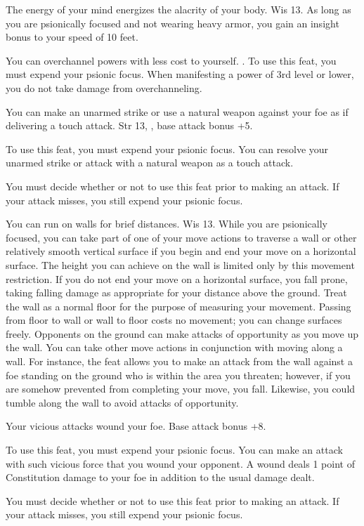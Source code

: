 {The energy of your mind energizes the alacrity of your body.}
{Wis 13.}
{As long as you are psionically focused and not wearing heavy armor, you gain an insight bonus to your speed of 10 feet.}
{}{}

{You can overchannel powers with less cost to yourself.}
{.}
{To use this feat, you must expend your psionic focus. When manifesting a power of 3rd level or lower, you do not take damage from overchanneling.}
{}{}

{You can make an unarmed strike or use a natural weapon against your foe as if delivering a touch attack.}
{Str 13, , base attack bonus +5.}
{To use this feat, you must expend your psionic focus. You can resolve your unarmed strike or attack with a natural weapon as a touch attack.

You must decide whether or not to use this feat prior to making an attack. If your attack misses, you still expend your psionic focus.}
{}{}

{You can run on walls for brief distances.}
{Wis 13.}
{While you are psionically focused, you can take part of one of your move actions to traverse a wall or other relatively smooth vertical surface if you begin and end your move on a horizontal surface. The height you can achieve on the wall is limited only by this movement restriction. If you do not end your move on a horizontal surface, you fall prone, taking falling damage as appropriate for your distance above the ground. Treat the wall as a normal floor for the purpose of measuring your movement. Passing from floor to wall or wall to floor costs no movement; you can change surfaces freely. Opponents on the ground can make attacks of opportunity as you move up the wall.}
{}
{You can take other move actions in conjunction with moving along a wall. For instance, the  feat allows you to make an attack from the wall against a foe standing on the ground who is within the area you threaten; however, if you are somehow prevented from completing your move, you fall. Likewise, you could tumble along the wall to avoid attacks of opportunity.}

{Your vicious attacks wound your foe.}
{Base attack bonus +8.}
{To use this feat, you must expend your psionic focus. You can make an attack with such vicious force that you wound your opponent. A wound deals 1 point of Constitution damage to your foe in addition to the usual damage dealt.

You must decide whether or not to use this feat prior to making an attack. If your attack misses, you still expend your psionic focus.}
{}{}
